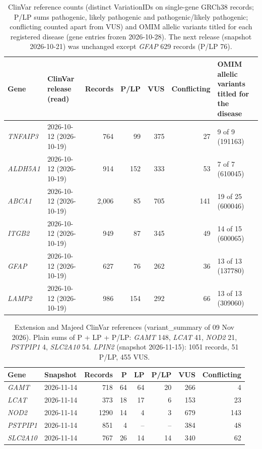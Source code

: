 \documentclass{article} %
\begin{document}
\begin{table}[h]
\caption{ClinVar reference counts (distinct VariationIDs on single-gene GRCh38 records; P/LP sums pathogenic, likely pathogenic and pathogenic/likely pathogenic; conflicting counted apart from VUS) and OMIM allelic variants titled for each registered disease (gene entries frozen 2026-10-28). The next release (snapshot 2026-10-21) was unchanged except \emph{GFAP} 629 records (P/LP 76).}
\label{tab:refdata}
\begin{center}
\scriptsize
\begin{tabular}{llrrrrl}
\toprule
Gene & ClinVar release (read) & Records & P/LP & VUS & Conflicting & OMIM allelic variants titled for the disease \\
\midrule
\emph{TNFAIP3} & 2026-10-12 (2026-10-19) & 764 & 99 & 375 & 27 & 9 of 9 (191163) \\
\emph{ALDH5A1} & 2026-10-12 (2026-10-19) & 914 & 152 & 333 & 53 & 7 of 7 (610045) \\
\emph{ABCA1} & 2026-10-12 (2026-10-19) & 2,006 & 85 & 705 & 141 & 19 of 25 (600046) \\
\emph{ITGB2} & 2026-10-12 (2026-10-19) & 949 & 87 & 345 & 49 & 14 of 15 (600065) \\
\emph{GFAP} & 2026-10-12 (2026-10-19) & 627 & 76 & 262 & 36 & 13 of 13 (137780) \\
\emph{LAMP2} & 2026-10-12 (2026-10-19) & 986 & 154 & 292 & 66 & 13 of 13 (309060) \\
\bottomrule
\end{tabular}
\end{center}
\end{table}

\begin{table}[h]
\caption{Extension and Majeed ClinVar references (variant\_summary of 09 Nov 2026). Plain sums of P + LP + P/LP: \emph{GAMT} 148, \emph{LCAT} 41, \emph{NOD2} 21, \emph{PSTPIP1} 4, \emph{SLC2A10} 54. \emph{LPIN2} (snapshot 2026-11-15): 1051 records, 51 P/LP, 455 VUS.}
\begin{center}
\scriptsize
\begin{tabular}{llrrrrrr}
\toprule
Gene & Snapshot & Records & P & LP & P/LP & VUS & Conflicting \\
\midrule
\emph{GAMT} & 2026-11-14 & 718 & 64 & 64 & 20 & 266 & 4 \\
\emph{LCAT} & 2026-11-14 & 373 & 18 & 17 & 6 & 153 & 23 \\
\emph{NOD2} & 2026-11-14 & 1290 & 14 & 4 & 3 & 679 & 143 \\
\emph{PSTPIP1} & 2026-11-14 & 851 & 4 & -- & -- & 384 & 48 \\
\emph{SLC2A10} & 2026-11-14 & 767 & 26 & 14 & 14 & 340 & 62 \\
\bottomrule
\end{tabular}
\end{center}
\end{table}
\end{document}
